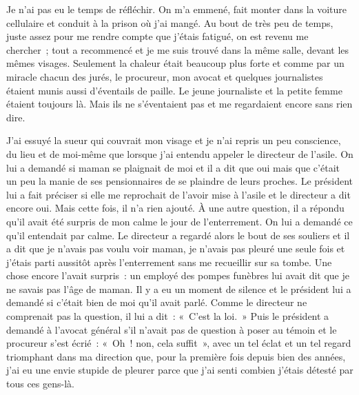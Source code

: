 \documentclass[french,twoside]{book} %
\begin{document}
Je n’ai pas eu le temps de réfléchir. On m’a emmené, fait monter dans la voiture cellulaire et conduit à la prison où j’ai mangé. Au bout de très peu de temps, juste assez pour me rendre compte que j’étais fatigué, on est revenu me chercher ; tout a recommencé et je me suis trouvé dans la même salle, devant les mêmes visages. Seulement la chaleur était beaucoup plus forte et comme par un miracle chacun des jurés, le procureur, mon avocat et quelques journalistes étaient munis aussi d’éventails de paille. Le jeune journaliste et la petite femme étaient toujours là. Mais ils ne s’éventaient pas et me regardaient encore sans rien dire.\par
J'ai essuyé la sueur qui couvrait mon visage et je n’ai repris un peu conscience, du lieu et de moi-même que lorsque j’ai entendu appeler le directeur de l’asile. On lui a demandé si maman se plaignait de moi et il a dit que oui mais que c’était un peu la manie de ses pensionnaires de se plaindre de leurs proches. Le président lui a fait préciser si elle me reprochait de l’avoir mise à l’asile et le directeur a dit encore oui. Mais cette fois, il n’a rien ajouté. À une autre question, il a répondu qu’il avait été surpris de mon calme le jour de l’enterrement. On lui a demandé ce qu’il entendait par calme. Le directeur a regardé alors le bout de ses souliers et il a dit que je n’avais pas voulu voir maman, je n’avais pas pleuré une seule fois et j’étais parti aussitôt après l’enterrement sans me recueillir sur sa tombe. Une chose encore l’avait surpris : un employé des pompes funèbres lui avait dit que je ne savais pas l’âge de maman. Il y a eu un moment de silence et le président lui a demandé si c’était bien de moi qu’il avait parlé. Comme le directeur ne comprenait pas la question, il lui a dit : « C'est la loi. » Puis le président a demandé à l’avocat général s’il n’avait pas de question à poser au témoin et le procureur s’est écrié : « Oh ! non, cela suffit », avec un tel éclat et un tel regard triomphant dans ma direction que, pour la première fois depuis bien des années, j’ai eu une envie stupide de pleurer parce que j’ai senti combien j’étais détesté par tous ces gens-là.\par
\end{document}
